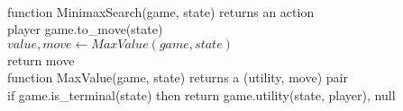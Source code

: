\documentclass[preview]{standalone}
\begin{document}
\begin{center}
\quad\\function MinimaxSearch(game, state) returns an action\quad\\player \gets game.to\_move(state)\quad\\$value, move \gets MaxValue(game, state)$\quad\\return move\quad\\function MaxValue(game, state) returns a (utility, move) pair\quad\\if game.is\_terminal(state) then return game.utility(state, player), null
\end{center}
\end{document}
